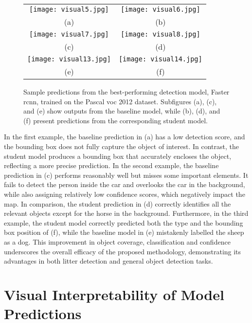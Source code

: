 \begin{figure}[!ht]
  \centering
  \begin{tabular}{cc}
    \texttt{[image: visual5.jpg]} &
    \texttt{[image: visual6.jpg]} \\
    \small (a) & \small (b) \\
    \addlinespace[1em]
    \texttt{[image: visual7.jpg]} &
    \texttt{[image: visual8.jpg]} \\
    \small (c) & \small (d) \\
    \addlinespace[1em]
    \texttt{[image: visual13.jpg]} &
    \texttt{[image: visual14.jpg]} \\
    \small (e) & \small (f) \\
  \end{tabular}
  \caption{Sample predictions from the best-performing detection model, Faster \gls{rcnn}, trained on the Pascal \gls{voc} 2012 dataset. Subfigures (a), (c), and (e) show outputs from the baseline model, while (b), (d), and (f) present predictions from the corresponding student model.}
  \label{fig:visuals_pascal_voc}
\end{figure}

In the first example, the baseline prediction in (a) has a low detection score, and the bounding box does not fully capture the object of interest. In contrast, the student model produces a bounding box that accurately encloses the object, reflecting a more precise prediction. In the second example, the baseline prediction in (c) performs reasonably well but misses some important elements. It fails to detect the person inside the car and overlooks the car in the background, while also assigning relatively low confidence scores, which negatively impact the \gls{map}.
In comparison, the student prediction in (d) correctly identifies all the relevant objects except for the horse in the background. 
Furthermore, in the third example, the student model correctly predicted both the type and the bounding box position of (f), while the baseline model in (e) mistakenly labelled the sheep as a dog. This improvement in object coverage, classification and confidence underscores the overall efficacy of the proposed methodology, demonstrating its advantages in both litter detection and general object detection tasks.


\section{Visual Interpretability of Model Predictions}
\label{sec:5_interpretability}

